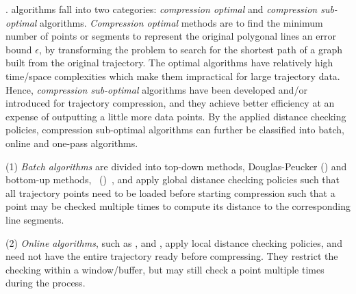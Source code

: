 %


. \lsa algorithms fall into two categories: \textit{compression optimal} and \textit{compression sub-optimal} algorithms.
\textit{Compression optimal} methods \cite{Imai:Optimal,Chan:Optimal} are to find the minimum number of points or segments to represent the original polygonal lines \wrt an error bound $\epsilon$, by transforming the problem to search for the shortest path of a graph built from the original trajectory.
The optimal \lsa algorithms have relatively high time/space complexities which make them impractical for large trajectory data.
Hence, \textit{compression sub-optimal} algorithms have been developed and/or introduced for trajectory compression, and they achieve better efficiency at an expense of outputting a little more data points. By the applied distance checking policies, compression sub-optimal algorithms can further be classified into batch, online and one-pass algorithms.

\sstab (1) {\em Batch algorithms} are divided into top-down methods, \eg Douglas-Peucker (\dpa) \cite{Douglas:Peucker,Meratnia:Spatiotemporal} and bottom-up methods, \eg\ \pavlidis (\tpa)~\cite{Pavlidis:Segment}, and apply global distance checking policies such that all trajectory points need to be loaded before starting compression such that a point may be checked multiple times to compute its distance to the corresponding line segments.

\sstab (2) {\em Online algorithms}, such as \opwa \cite{Meratnia:Spatiotemporal}, \squishe \cite{Muckell:SQUISH} and \bqsa \cite{Liu:BQS}, apply local distance checking policies, and need not have the entire trajectory ready before compressing. They restrict the checking within a window/buffer, but may still check a point  multiple times during the process.

